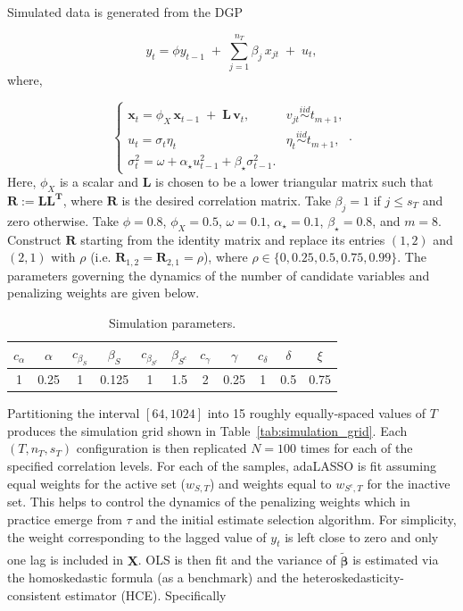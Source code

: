 \documentclass[10pt,a4paper,oneside]{article}
\begin{document}
Simulated data is generated from the DGP

\begin{equation*}
y_t 
= 
\displaystyle \phi y_{t - 1}
\;+\;
\sum^{n_T}_{j = 1} \beta_j\,x_{j t}
\;+\; u_t,  
\end{equation*}
where,

\[
\begin{cases}
\mathbf{x}_t=
\displaystyle \phi_X \,\mathbf{x}_{t-1}
\;+\;
\mathbf{L}\,\mathbf{v}_t,
&
v_{jt} \overset{iid}{\sim} t_{m + 1},\\[2ex]
u_t = \sigma_t \eta_t 
&
\eta_t \overset{iid}{\sim} t_{m + 1},\\[2ex]
\sigma^2_t = \omega + \alpha_{\star} u_{t - 1}^2 + \beta_{\star} \sigma^2_{t - 1}.
\end{cases}.
\]
Here, $\phi_X$ is a scalar and $\mathbf{L}$ is chosen to be a lower triangular matrix such that $\mathbf{R} := \mathbf{L} \mathbf{L^T}$, where $\mathbf{R}$ is the desired correlation matrix. Take $\beta_j = 1$ if $j \leq s_T$ and zero otherwise. Take $\phi = 0.8$, $\phi_X = 0.5$, $\omega = 0.1$, $\alpha_\star = 0.1$, $\beta_\star = 0.8$, and $m = 8$. Construct $\mathbf{R}$ starting from the identity matrix and replace its entries $(1, 2)$ and $(2, 1)$ with $\rho$ (i.e. $\mathbf{R}_{1,2} = \mathbf{R}_{2,1} = \rho$), where $\rho \in \{0, 0.25, 0.5, 0.75, 0.99 \}$. The parameters governing the dynamics of the number of candidate variables and penalizing weights are given below.


\begin{table}[h]
  \caption{Simulation parameters.}

\centering
\begin{tabular}{ccccccccccc}
\hline
$c_{\alpha}$ & $\alpha$ & $c_{\beta_{S}}$ & $\beta_{S}$ & $c_{\beta_{S^c}}$ & $\beta_{S^c}$ & $c_{\gamma}$ & $\gamma$ & $c_{\delta}$ & $\delta$ & $\xi$ \\
\hline
1 & 0.25 & 1 & 0.125 & 1 & 1.5 & 2 & 0.25 & 1 & 0.5 & 0.75 \\
\hline
\end{tabular}

\end{table}

Partitioning the interval $[64,1024]$ into 15 roughly equally‐spaced values of $T$ produces the simulation grid shown in Table~\ref{tab:simulation_grid}.  Each $(T,n_T,s_T)$ configuration is then replicated $N=100$ times for each of the specified correlation levels. For each of the samples, adaLASSO is fit assuming equal weights for the active set ($w_{S,T}$) and weights equal to $w_{S^c, T}$ for the inactive set. This helps to control the dynamics of the penalizing weights which in practice emerge from $\tau$ and the initial estimate selection algorithm. For simplicity, the weight corresponding to the lagged value of $y_t$ is left close to zero and only one lag is included in $\mathbf{X}$. OLS is then fit and the variance of $\hat{\tilde{\boldsymbol{\beta}}}$ is estimated via the homoskedastic formula (as a benchmark) and the heteroskedasticity-consistent estimator (HCE). Specifically
\end{document}
